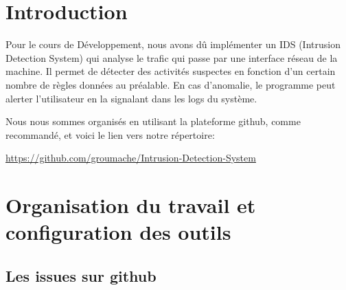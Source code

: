 \documentclass[a4paper]{article}
\begin{document}
\let\cleardoublepage\clearpage










\section{Introduction}





Pour le cours de Développement, nous avons dû implémenter un IDS (Intrusion Detection System) qui analyse le trafic qui passe par une interface réseau de la machine. Il permet de détecter des activités suspectes en fonction d'un certain nombre de règles données au préalable. En cas d'anomalie, le programme peut alerter l'utilisateur en la signalant dans les logs du système.

Nous nous sommes organisés en utilisant la plateforme github, comme recommandé, et voici le lien vers notre répertoire: 
\begin{center}
    {\small \url{https://github.com/groumache/Intrusion-Detection-System}}
\end{center}










\section{Organisation du travail et configuration des outils}





\subsection{Les issues sur github}
\end{document}
